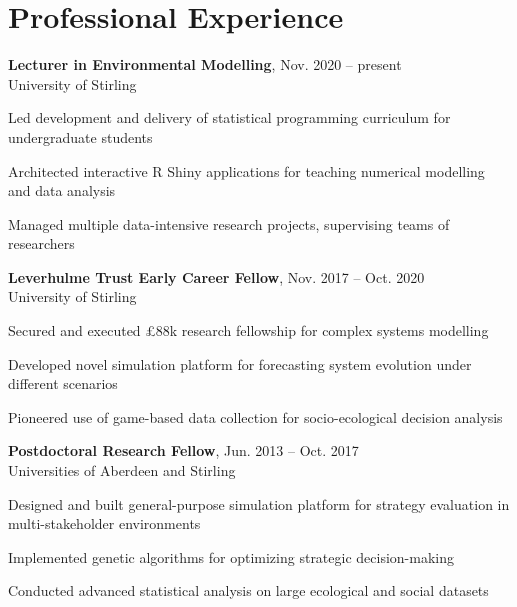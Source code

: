 \documentclass[letterpaper]{article}
\renewenvironment{itemize}{
  \begin{list}{}{
    \setlength{\leftmargin}{1.5em}
  }
}{
  \end{list}
}
\begin{document}
\begin{minipage}{0.65\linewidth}
\section*{Professional Experience}
\begin{itemize}
	\item{\bf Lecturer in Environmental Modelling}, Nov. 2020 -- present \\
	University of Stirling
	\begin{itemize}
	    \item Led development and delivery of statistical programming curriculum for undergraduate students
	    \item Architected interactive R Shiny applications for teaching numerical modelling and data analysis
	    \item Managed multiple data-intensive research projects, supervising teams of researchers
	\end{itemize}
\end{itemize}
\begin{itemize}
	\item{\bf Leverhulme Trust Early Career Fellow}, Nov. 2017 -- Oct. 2020 \\
	University of Stirling
	\begin{itemize}
	    \item Secured and executed £88k research fellowship for complex systems modelling
	    \item Developed novel simulation platform for forecasting system evolution under different scenarios
	    \item Pioneered use of game-based data collection for socio-ecological decision analysis
	\end{itemize}
\end{itemize}
\begin{itemize}
	\item{\bf Postdoctoral Research Fellow}, Jun. 2013 -- Oct. 2017 \\
	Universities of Aberdeen and Stirling
	\begin{itemize}
	    \item Designed and built general-purpose simulation platform for strategy evaluation in multi-stakeholder environments
	    \item Implemented genetic algorithms for optimizing strategic decision-making
	    \item Conducted advanced statistical analysis on large ecological and social datasets
	\end{itemize}
\end{itemize}


\end{minipage}
\end{document}
